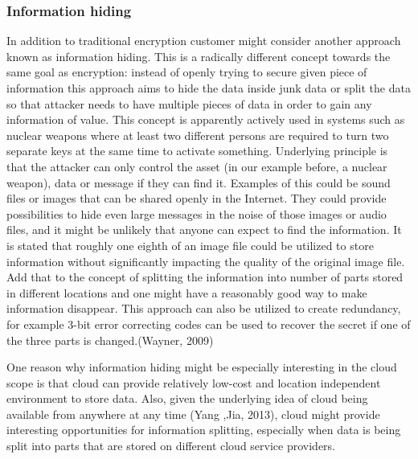 \documentclass{article}
\begin{document}
\subsubsection{Information hiding}
In addition to traditional encryption customer might consider another approach known as information hiding. This is a radically different concept towards the same goal as encryption: instead of openly trying to secure given piece of information this approach aims to hide the data inside junk data or split the data so that attacker needs to have multiple pieces of data in order to gain any information of value. This concept is apparently actively used in systems such as nuclear weapons where at least two different persons are required to turn two separate keys at the same time to activate something. Underlying principle is that the attacker can only control the asset (in our example before, a nuclear weapon), data or message if they can find it. Examples of this could be sound files or images that can be shared openly in the Internet. They could provide possibilities to hide even large messages in the noise of those images or audio files, and it might be unlikely that anyone can expect to find the information. It is stated that roughly one eighth of an image file could be utilized to store information without significantly impacting the quality of the original image file. Add that to the concept of splitting the information into number of parts stored in different locations and one might have a reasonably good way to make information disappear. This approach can also be utilized to create redundancy, for example 3-bit error correcting codes can be used to recover the secret if one of the three parts is changed.(Wayner, 2009)
\par
One reason why information hiding might be especially interesting in the cloud scope is that cloud can provide relatively low-cost and location independent environment to store data. Also, given the underlying idea of cloud being available from anywhere at any time (Yang ,Jia, 2013), cloud might provide interesting opportunities for information splitting, especially when data is being split into parts that are stored on different cloud service providers.
\end{document}
